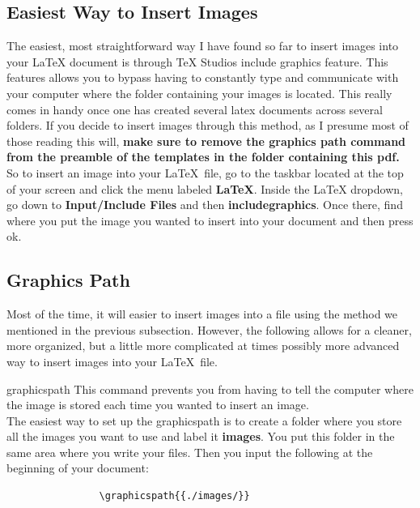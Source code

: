 	\subsection{Easiest Way to Insert Images}
	The easiest, most straightforward way I have found so far to insert images into your LaTeX document is through TeX Studios include graphics feature. This features allows you to bypass having to constantly type and communicate with your computer where the folder containing your images is located. This really comes in handy once one has created several latex documents across several folders. If you decide to insert images through this method, as I presume most of those reading this will, \textbf{make sure to remove the graphics path command from the preamble of the templates in the folder containing this pdf.}
\vspace{4mm}\\
	So to insert an image into your \LaTeX\ file, go to the taskbar located at the top of your screen and click the menu labeled \textbf{LaTeX}. Inside the LaTeX dropdown, go down to \textbf{Input/Include Files} and then \textbf{includegraphics}. Once there, find where you put the image you wanted to insert into your document and then press ok.
	\subsection{Graphics Path}
	Most of the time, it will easier to insert images into a file using the method we mentioned in the previous subsection. However, the following allows for a cleaner, more organized, but a little more complicated at times possibly more advanced way to insert images into your \LaTeX\ file.
		\begin{docCommand}{graphicspath}{}
			This command prevents you from having to tell the computer where the image is stored each time you wanted to insert an image.\\
			The easiest way to set up the graphicspath is to create a folder where you store all the images you want to use and label it \textbf{images}. You put this folder in the same area where you write your files. Then you input the following at the beginning of your document: 
			\begin{verbatim}
				\graphicspath{{./images/}}
			\end{verbatim}
		\end{docCommand}
